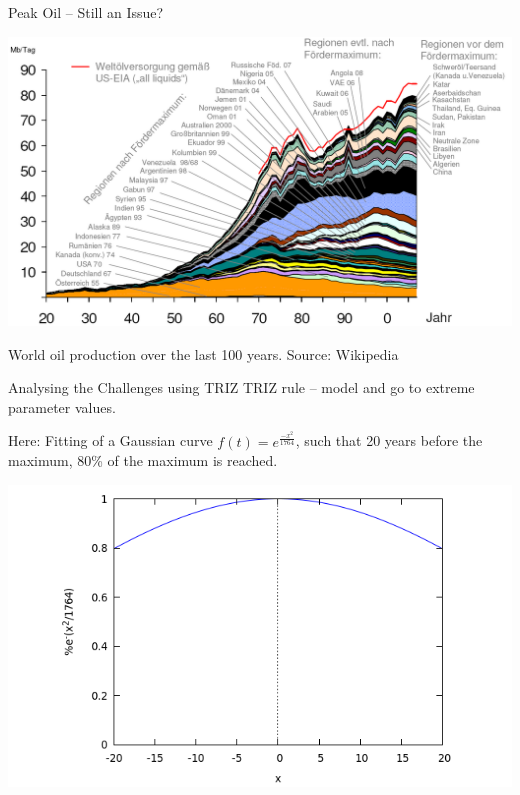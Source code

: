 \documentclass{beamer}
\begin{document}
\begin{frame}{Peak Oil -- Still an Issue?}

  \begin{center}
    \includegraphics[width=.95\textwidth]{Bilder/ZNEj4U.png}
  
    World oil production over the last 100 years. Source: Wikipedia
  \end{center}
\end{frame}

\begin{frame}{Analysing the Challenges using TRIZ}
  TRIZ rule -- model and go to extreme parameter values.

  Here: Fitting of a Gaussian curve $f(t)=e^{\frac{-x^2}{1764}}$, such that 20
  years before the maximum, 80\% of the maximum is reached.
  \begin{center}
    \includegraphics[width=.8\textwidth]{Bilder/aA9bD9.png}
  \end{center}
\end{frame}
\end{document}
